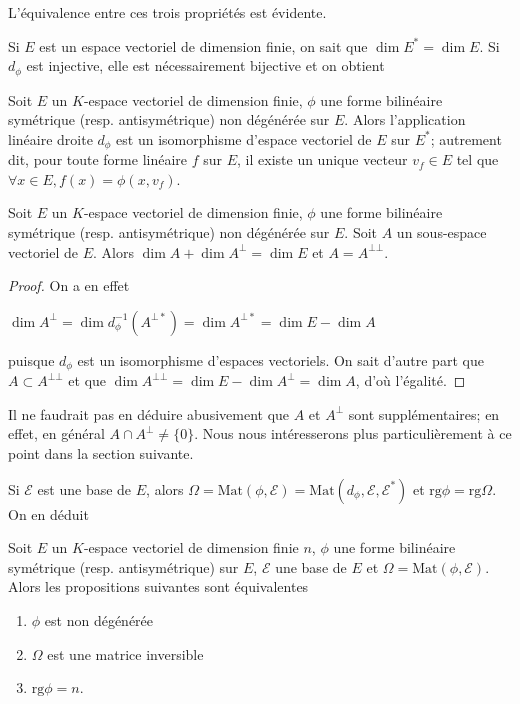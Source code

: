 L'équivalence entre ces trois propriétés est évidente.

Si $E$ est un espace vectoriel de dimension finie, on sait que $\dim E^* = \dim E$. Si $d_\phi$ est injective, elle est nécessairement bijective et on obtient

\begin{thm}
Soit $E$ un $K$-espace vectoriel de dimension finie, $\phi$ une forme bilinéaire symétrique (resp. antisymétrique) non dégénérée sur $E$. Alors l'application linéaire droite $d_\phi$ est un isomorphisme d'espace vectoriel de $E$ sur $E^*$; autrement dit, pour toute forme linéaire $f$ sur $E$, il existe un unique vecteur $v_f \in E$ tel que $\forall x \in E, f(x) = \phi(x,v_f)$.
\end{thm}

\begin{thm}
Soit $E$ un $K$-espace vectoriel de dimension finie, $\phi$ une forme bilinéaire symétrique (resp. antisymétrique) non dégénérée sur $E$. Soit $A$ un sous-espace vectoriel de $E$. Alors $\dim A + \dim A^\bot = \dim E$ et $A = A^{\bot\bot}$.
\end{thm}

\begin{proof}
On a en effet

$\dim A^\bot = \dim d_\phi^{-1}(A^{\bot *}) = \dim A^{\bot *} = \dim E - \dim A$

puisque $d_\phi$ est un isomorphisme d'espaces vectoriels. On sait d'autre part que $A \subset A^{\bot\bot}$ et que $\dim A^{\bot\bot} = \dim E - \dim A^\bot = \dim A$, d'où l'égalité.
\end{proof}

\begin{rem}
Il ne faudrait pas en déduire abusivement que $A$ et $A^\bot$ sont supplémentaires; en effet, en général $A \cap A^\bot \neq \{0\}$. Nous nous intéresserons plus particulièrement à ce point dans la section suivante.
\end{rem}

Si $\mathcal{E}$ est une base de $E$, alors $\Omega = \mathrm{Mat}(\phi,\mathcal{E}) = \mathrm{Mat}(d_\phi,\mathcal{E},\mathcal{E}^*)$ et $\mathrm{rg} \phi = \mathrm{rg} \Omega$. On en déduit

\begin{thm}
Soit $E$ un $K$-espace vectoriel de dimension finie $n$, $\phi$ une forme bilinéaire symétrique (resp. antisymétrique) sur $E$, $\mathcal{E}$ une base de $E$ et $\Omega = \mathrm{Mat}(\phi,\mathcal{E})$. Alors les propositions suivantes sont équivalentes
\begin{enumerate}
\item $\phi$ est non dégénérée
\item $\Omega$ est une matrice inversible
\item $\mathrm{rg} \phi = n$.
\end{enumerate}
\end{thm}

